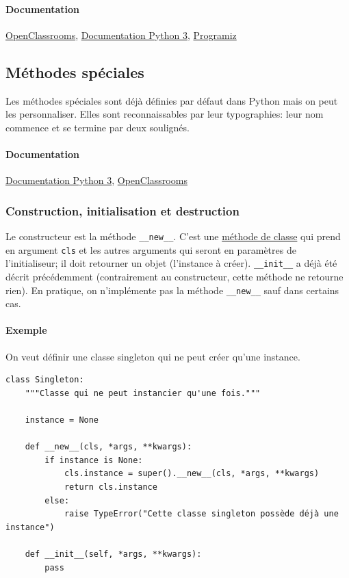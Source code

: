 \documentclass[a4paper, french, 10pt]{article}
\newcommand{\code}[1]{{\small\texttt{#1}}}
\begin{document}
\paragraph{Documentation} \href{https://openclassrooms.com/courses/apprenez-a-programmer-en-python/l-heritage-9}{OpenClassrooms}, \href{https://docs.python.org/fr/3/tutorial/classes.html?highlight=héritage#inheritance}{Documentation Python 3}, \href{https://www.programiz.com/python-programming/inheritance}{Programiz}
\subsection{Méthodes spéciales}
 Les méthodes spéciales sont déjà définies par défaut dans Python mais on peut les personnaliser. Elles sont reconnaissables par leur typographies: leur nom commence et se termine par deux soulignés.

\paragraph{Documentation} \href{https://docs.python.org/3/reference/datamodel.html#specialnames}{Documentation Python 3}, \href{https://openclassrooms.com/courses/apprenez-a-programmer-en-python/les-methodes-speciales-1}{OpenClassrooms}


\subsubsection{Construction, initialisation et destruction}
Le constructeur est la méthode \code{\_\_new\_\_}. C'est une \hyperref[sec:classmethod]{méthode de classe} qui prend en argument \code{cls} et les autres arguments qui seront en paramètres de l'initialiseur; il doit retourner un objet (l'instance à créer). \code{\_\_init\_\_} a déjà été décrit précédemment (contrairement au constructeur, cette méthode ne retourne rien). En pratique, on n'implémente pas la méthode \code{\_\_new\_\_} sauf dans certains cas.

\paragraph{Exemple} On veut définir une classe \og singleton \fg{} qui ne peut créer qu'une instance.

\begin{verbatim}
class Singleton:
    """Classe qui ne peut instancier qu'une fois."""

    instance = None

    def __new__(cls, *args, **kwargs):
        if instance is None:
            cls.instance = super().__new__(cls, *args, **kwargs)
            return cls.instance
        else:
            raise TypeError("Cette classe singleton possède déjà une instance")

    def __init__(self, *args, **kwargs):
        pass
\end{verbatim}
\end{document}
